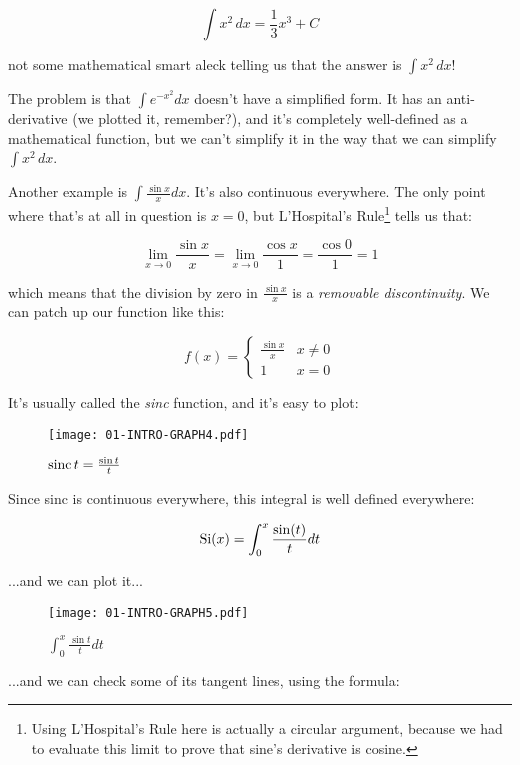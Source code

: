 $$\int x^2\,dx = \frac{1}{3} x^3 + C$$

not some mathematical smart aleck telling us that the answer is $\int x^2\,dx$!

The problem is that $\int e^{-x^2} dx$ doesn't have a simplified form.  It has an anti-derivative
(we plotted it, remember?), and it's completely well-defined as a mathematical function, but we
can't simplify it in the way that we can simplify $\int x^2\,dx$.

Another example is $\int \frac{\sin x}{x} dx$.  It's also continuous everywhere.  The only point
where that's at all in question is $x=0$, but L'Hospital's Rule\footnote{Using L'Hospital's Rule here is actually
a circular argument, because we had to evaluate this limit to prove that sine's derivative is cosine.} tells us that:

$$\lim_{x\to 0} \frac{\sin x}{x} = \lim_{x\to 0} \frac{\cos x}{1} = \frac{\cos 0}{1} = 1$$

which means that the division by zero in $\frac{\sin x}{x}$ is a {\it removable discontinuity}.
We can patch up our function like this:

\[ f(x) = \begin{cases} 
      \frac{\sin x}{x} & x \ne 0 \\
      1 & x = 0
   \end{cases}
\]

It's usually called the {\it sinc} function, and it's easy to plot:

\begin{figure}[H]
\begin{center}
\texttt{[image: 01-INTRO-GRAPH4.pdf]}
\end{center}
\caption{${\rm sinc\,} t = \frac{\sin t}{t}$}
\end{figure}

Since sinc is continuous everywhere, this integral is well defined everywhere:

$${\rm Si}(x) = \int_0^x \frac{\sin(t)}{t} dt$$

...and we can plot it...

\begin{figure}[H]
\begin{center}
\texttt{[image: 01-INTRO-GRAPH5.pdf]}
\end{center}
\caption{$\int_0^x \frac{\sin t}{t} dt$}
\end{figure}

...and we can check some of its tangent lines, using the formula:

